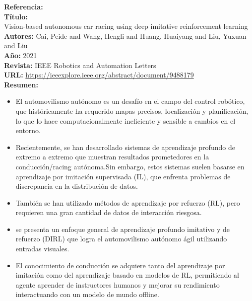 \documentclass[10pt,letterpaper,final]{article}
\begin{document}
\begin{longtable}
        \hline
        \noindent \textbf{Referencia:}~\cite{cai2021vision}                                            \\
        \textbf{Título:}                                                                               \\
        Vision-based autonomous car racing using deep imitative reinforcement learning                 \\
        \textbf{Autores:}
        Cai, Peide and Wang, Hengli and Huang, Huaiyang and Liu, Yuxuan and Liu                        \\
        \textbf{Año:}
        2021                                                                                           \\
        \textbf{Revista:}
        IEEE Robotics and Automation Letters                                                           \\
        \textbf{URL:}
        \url{https://ieeexplore.ieee.org/abstract/document/9488179}                                    \\
        \textbf{Resumen:}
        \begin{itemize}
            \item El automovilismo autónomo es un desafío en el campo del control robótico, que históricamente ha requerido mapas precisos,
            localización y planificación, lo que lo hace computacionalmente ineficiente y sensible a cambios en el entorno.
            \item Recientemente, se han desarrollado sistemas de aprendizaje profundo de extremo a extremo que muestran resultados prometedores
            en la conducción/racing autónoma.Sin embargo, estos sistemas suelen basarse en aprendizaje por imitación supervisada (IL),
            que enfrenta problemas de discrepancia en la distribución de datos.
            \item También se han utilizado métodos de aprendizaje por refuerzo (RL), pero requieren una gran cantidad de datos de interacción riesgosa.
            \item se presenta un enfoque general de aprendizaje profundo imitativo y de refuerzo (DIRL) que logra el automovilismo
            autónomo ágil utilizando entradas visuales.
            \item El conocimiento de conducción se adquiere tanto del aprendizaje por imitación como del aprendizaje basado en modelos de RL,
            permitiendo al agente aprender de instructores humanos y mejorar su rendimiento interactuando con un modelo de mundo offline.

\end{itemize}
\end{longtable}
\end{document}
